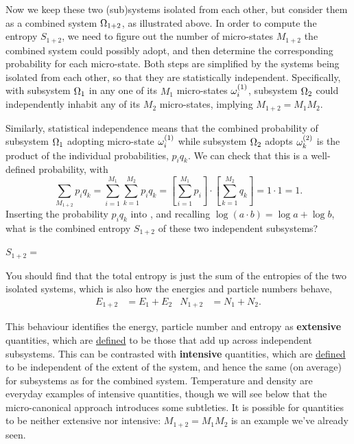 Now we keep these two (sub)systems isolated from each other, but consider them as a combined system $\Omega_{1+2}$, as illustrated above.
In order to compute the entropy $S_{1+2}$, we need to figure out the number of micro-states $M_{1+2}$ the combined system could possibly adopt, and then determine the corresponding probability for each micro-state.
Both steps are simplified by the systems being isolated from each other, so that they are statistically independent.
Specifically, with subsystem $\Omega_1$ in any one of its $M_1$ micro-states $\omega_i^{(1)}$, subsystem $\Omega_2$ could independently inhabit any of its $M_2$ micro-states, implying $M_{1+2} = M_1 M_2$.

Similarly, statistical independence means that the combined probability of subsystem $\Omega_1$ adopting micro-state $\omega_i^{(1)}$ while subsystem $\Omega_2$ adopts $\omega_k^{(2)}$ is the product of the individual probabilities, $p_i q_k$.
We can check that this is a well-defined probability, with
\begin{equation*}
  \sum_{M_{1+2}} p_i q_k = \sum_{i = 1}^{M_1} \sum_{k = 1}^{M_2} p_i q_k = \left[\sum_{i = 1}^{M_1} p_i\right]\cdot \left[\sum_{k = 1}^{M_2} q_k\right] = 1\cdot 1 = 1.
\end{equation*}
Inserting the probability $p_i q_k$ into , and recalling $\log(a\cdot b) = \log a + \log b$, what is the combined entropy $S_{1+2}$ of these two independent subsystems?
\begin{mdframed}
  $S_{1+2} = $ \\[80 pt]
\end{mdframed}
You should find that the total entropy is just the sum of the entropies of the two isolated systems, which is also how the energies and particle numbers behave,
\begin{align*}
  E_{1+2} & = E_1 + E_2 &
  N_{1+2} & = N_1 + N_2.
\end{align*}

This behaviour identifies the energy, particle number and entropy as \textbf{extensive} quantities, which are \href{https://goldbook.iupac.org/terms/view/E02281}{defined} to be those that add up across independent subsystems.
This can be contrasted with \textbf{intensive} quantities, which are \href{https://goldbook.iupac.org/terms/view/I03074}{defined} to be independent of the extent of the system, and hence the same (on average) for subsystems as for the combined system. %
Temperature and density are everyday examples of intensive quantities, though we will see below that the micro-canonical approach introduces some subtleties.
It is possible for quantities to be neither extensive nor intensive: $M_{1+2} = M_1 M_2$ is an example we've already seen.

